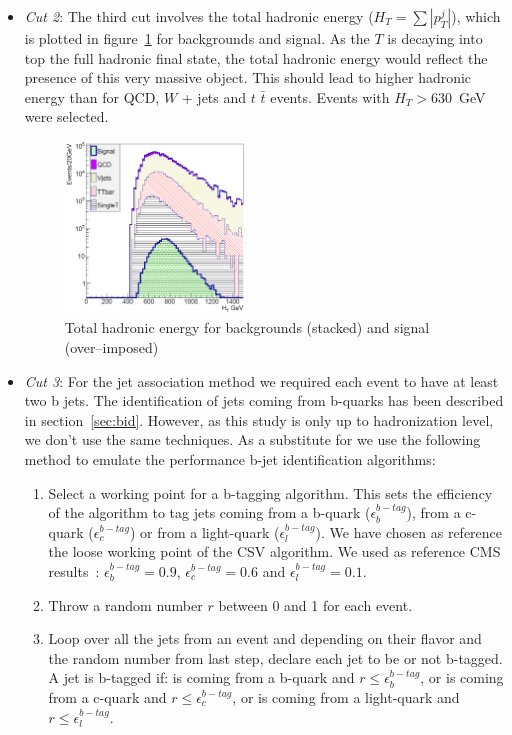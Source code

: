 \begin{itemize}
\item \textit{Cut 2}: The third cut involves the total hadronic energy ($H_{T}=\sum |p_{T}^{j}|$), which is plotted in figure~\ref{fig:Var2} for backgrounds and signal. As the $T$ is decaying into top the full hadronic final state, the total hadronic energy would reflect the presence of this very massive object. This should lead to higher hadronic energy than for QCD, $W$ + jets and $t$ $\bar{t}$ events. Events with $H_{T}>630$~GeV were selected.

\begin{figure}[!Hhtbp]
  \begin{center}
    \includegraphics[width=0.45\textwidth]{figs/Pheno/HT.png}
    \caption{Total hadronic energy for backgrounds (stacked) and signal (over--imposed)}
    \label{fig:Var2}
  \end{center}
\end{figure}

\item \textit{Cut 3}: For the jet association method we required each event to have at least two b jets. The identification of jets coming from b-quarks has been described in section~\ref{sec:bid}. However, as this study is only up to hadronization level, we don't use the same techniques. As a substitute for we use the following method to emulate the performance b-jet identification algorithms:
  \begin{enumerate}
  \item Select a working point for a b-tagging algorithm. This sets the efficiency of the algorithm to tag jets coming from a b-quark ($\epsilon^{b-tag}_{b}$), from a c-quark ($\epsilon^{b-tag}_{c}$) or from a light-quark ($\epsilon^{b-tag}_{l}$). We have chosen as reference the loose working point of the CSV algorithm. We used as reference CMS results~\cite{CMS-PAS-BTV-13-001}: $\epsilon^{b-tag}_{b}=0.9$, $\epsilon^{b-tag}_{c}=0.6$ and $\epsilon^{b-tag}_{l}=0.1$. 
  \item Throw a random number $r$ between 0 and 1 for each event.
  \item Loop over all the jets from an event and depending on their flavor and the random number from last step, declare each jet to be or not b-tagged. A jet is b-tagged if: is coming from a b-quark and $r\leq\epsilon^{b-tag}_{b}$, or is coming from a c-quark and $r\leq\epsilon^{b-tag}_{c}$, or is coming from a light-quark and $r\leq\epsilon^{b-tag}_{l}$.
  \end{enumerate}


\end{itemize}
